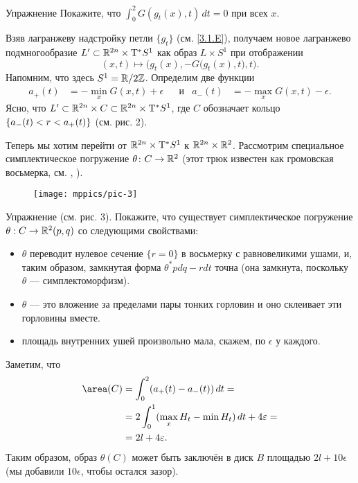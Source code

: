 \begin{ex*}{Упражнение}
Покажите, что $\int_0^2 G(g_t(x),t)\,dt = 0$ при всех $x$.
\end{ex*}

Взяв лагранжеву надстройку петли $\{g_t\}$ (см. \ref{3.1.E}),
получаем новое лагранжево подмногообразие $L' \subset \RR^{2n} \z\times \T^{\ast} S^1$ как образ $L \times S^1$ при отображении 
\[(x, t) \mapsto \Big(g_t (x), -G \big(g_t (x), t\big), t\Big).\]
Напомним, что здесь $S^1 = \mathbb{R} / 2\mathbb{Z}$.
Определим две функции 
\begin{align*}a_+ (t) &= - \min_x G (x, t) + \epsilon
&&\text{и}&
a_- (t) &= - \max_x G (x, t) - \epsilon.
\end{align*}
Ясно, что $L' \subset \mathbb{R}^{2n} \times C \subset \mathbb{R}^{2n} \times \mathrm{T}^\ast S^1$, где $C$ обозначает кольцо 
$\{a_- (t) \z<r \z<a_+ (t)\}$
(см. рис. 2).

Теперь мы хотим перейти от $\mathbb{R}^{2n} \times \mathrm{T}^{\ast} S^1$ к $\mathbb{R}^{2n} \times \mathbb{R}^2$.
Рассмотрим специальное симплектическое погружение $\theta\colon C \to \mathbb{R}^2$
(этот трюк известен как громовская восьмерка, см. \cite{G1}, \cite{AL}).

\begin{figure}[ht!]
\vskip-0mm
\centering
\texttt{[image: mppics/pic-3]}
\caption{}\label{pic-3}
\vskip0mm
\end{figure}

\begin{ex*}{Упражнение}
(см. рис. 3).
Покажите, что существует симплектическое погружение $\theta: C \to \mathbb{R}^2 (p, q)$ со следующими свойствами: 
\begin{itemize}
\item $\theta$ переводит нулевое сечение $\{r = 0\}$ в восьмерку с равновеликими ушами, и, таким образом, замкнутая форма $\theta^\ast pdq - rdt$ точна (она замкнута, поскольку $\theta$ — симплектоморфизм).
\item $\theta$ — это вложение за пределами пары тонких горловин и оно склеивает эти горловины вместе.
\item площадь внутренних ушей произвольно мала, скажем, по $\epsilon$ у каждого. 
\end{itemize}
\end{ex*}

Заметим, что 
\begin{align*}
\area (C) 
&= \int_0^2(a_+ (t) - a_- (t))\,dt = 
\\
&=2 \int_0^1(\max_x H_t - \min H_t) \,dt + 4\epsilon =
\\
&=2l + 4\epsilon.
\end{align*}
Таким образом, образ $\theta (C)$ может быть заключён в диск $B$
площадью $2l + 10\epsilon$ (мы добавили $10\epsilon$, чтобы остался зазор).

